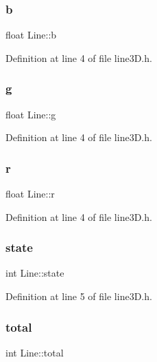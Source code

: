 \subsubsection{\texorpdfstring{b}{b}}
{\footnotesize\ttfamily float Line\+::b}



Definition at line 4 of file line3\+D.\+h.

\mbox{\label{struct_line_a18c636b47c164dfbf0c665c60a4cde8f}} 
\subsubsection{\texorpdfstring{g}{g}}
{\footnotesize\ttfamily float Line\+::g}



Definition at line 4 of file line3\+D.\+h.

\mbox{\label{struct_line_a3f97829ba40f49f7fb8408b66bdafa84}} 
\subsubsection{\texorpdfstring{r}{r}}
{\footnotesize\ttfamily float Line\+::r}



Definition at line 4 of file line3\+D.\+h.

\mbox{\label{struct_line_a7452de32bd854712f485a46dddff416b}} 
\subsubsection{\texorpdfstring{state}{state}}
{\footnotesize\ttfamily int Line\+::state}



Definition at line 5 of file line3\+D.\+h.

\mbox{\label{struct_line_a65c23427f8935b60c4f76ae8a7df1f98}} 
\subsubsection{\texorpdfstring{total}{total}}
{\footnotesize\ttfamily int Line\+::total}



